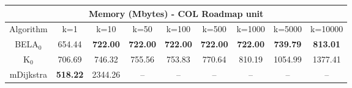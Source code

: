 \begin{tabular}{c|cccccccc}\toprule
\multicolumn{9}{c}{Memory (Mbytes) - COL Roadmap unit}\\ \midrule
Algorithm & k=1 & k=10 & k=50 & k=100 & k=500 & k=1000 & k=5000 & k=10000 \\ \midrule
BELA$_0$ & 654.44 & \textbf{722.00} & \textbf{722.00} & \textbf{722.00} & \textbf{722.00} & \textbf{722.00} & \textbf{739.79} & \textbf{813.01} \\
K$_0$ & 706.69 & 746.32 & 755.56 & 753.83 & 770.64 & 810.19 & 1054.99 & 1377.41 \\
mDijkstra & \textbf{518.22} & 2344.26 & -- & -- & -- & -- & -- & -- \\ \bottomrule 
\end{tabular}
